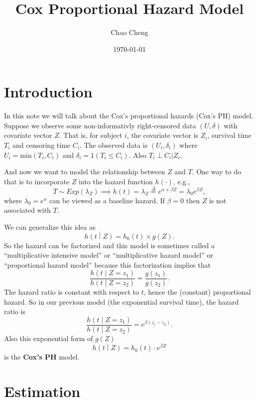 \documentclass[a4paper,12pt]{article}
\title{Cox Proportional Hazard Model}
\author{Chao Cheng}
\date{\today}
\begin{document}
\maketitle
\tableofcontents{}

\section{Introduction}
\label{sec:introduction}

In this note we will talk about the Cox's proportional hazards (Cox's PH) model. Suppose we observe some non-informativly right-censored data $\left(U, \delta\right)$ with covariate vector $Z$. That is, for subject $i$, the covariate vector is $Z_i$, survival time $T_i$ and censoring time $C_i$. The observed data is $\left(U_i, \delta_i\right)$ where $U_i = \mathrm{min}\left(T_i, C_i\right)$ and $\delta_i = 1\left(T_i \leq C_i\right)$. Also $T_i \perp C_i | Z_i$.
\par
And now we want to model the relationship between $Z$ and $T$. One way to do that is to incorporate $Z$ into the hazard function $h\left(\cdot\right)$, e.g.,
\[
  T \sim Exp\left(\lambda_Z\right)
  \implies
  h\left(t\right) = \lambda_Z
  \overset{\Delta}{=} e^{\alpha + \beta Z} = \lambda_0 e^{\beta Z}
  ,
\]
where $\lambda_0 = e^{\alpha}$ can be viewed as a baseline hazard. If $\beta = 0$ then $Z$ is not associated with $T$.
\par
We can generalize this idea as
\[
  h\left(t\middle|Z\right)
  = h_0\left(t\right) \times g\left(Z\right)
  .
\]
So the hazard can be factorized and this model is sometimes called a ``multiplicative intensive model'' or ``multiplicative hazard model'' or ``proportional hazard model'' because this factorization implies that
\[
  \frac{
    h\left(t\middle| Z = z_1\right)}{
    h\left(t\middle| Z = z_2\right)
  }
  = \frac{g\left(z_1\right)}{g\left(z_2\right)}
  .
\]
The hazard ratio is constant with respect to $t$, hence the (constant) proportional hazard. So in our previous model (the exponential survival time), the hazard ratio is
\[
  \frac{h\left(t\middle| Z = z_1\right)}{h\left(t\middle|Z = z_2\right)}
  = e^{\beta\left(z_1 - z_2\right)}
  .
\]
Also this exponential form of $g\left(Z\right)$
\begin{equation}
  \label{eq:cox_ph_form}
  h\left(t\middle|Z\right) = h_0\left(t\right)
  \cdot e^{\beta Z}  
\end{equation}
is the \textbf{Cox's PH} model.

\section{Estimation}
\label{sec:estimation}
\end{document}
